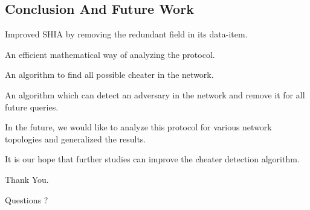 \documentclass[%
  slidesonly,%
  semlayer%
  ]{seminar}                                  %
\begin{document}
\begin{slide}
    \subsection*{Conclusion And Future Work}
      \vfill
      Improved SHIA by removing the redundant field in its data-item.
      
      An efficient mathematical way of analyzing the protocol. 
      
      An algorithm to find all possible cheater in the network.
      
      An algorithm which can detect an adversary in the network and remove it for all future queries.
      
      In the future, we would like to analyze this protocol for various network topologies and generalized the results.

      It is our hope that further studies can improve the cheater detection algorithm.

      \vfill
      \clearpage
      \vfill
        \begin{center}
          \Huge 
          Thank You.  

          Questions ?
        \end{center}
      \clearpage
  \vfill
  \clearpage
\end{slide}
\end{document}
